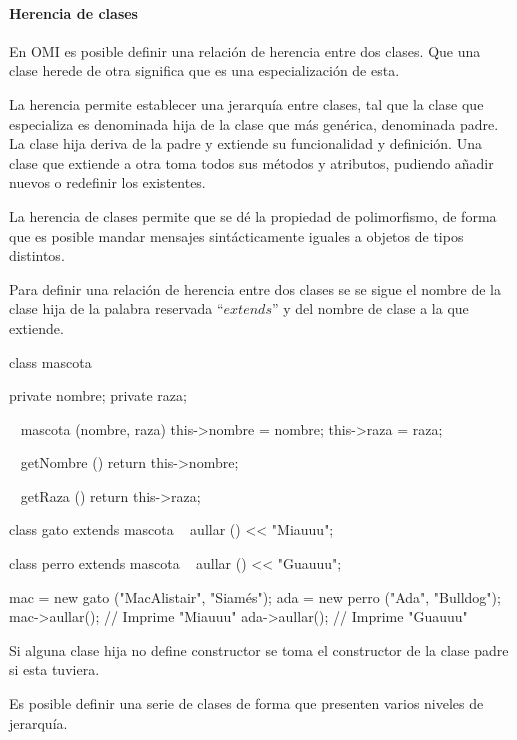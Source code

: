 \paragraph{Herencia de clases}


En OMI es posible definir una relación de herencia entre dos clases. Que una clase herede de otra significa 
que es una especialización de esta.  

La herencia permite establecer una jerarquía entre clases, tal que la clase que especializa es denominada 
hija de la clase que más genérica, denominada padre. La clase hija deriva de la padre y extiende su funcionalidad y definición.
Una clase que extiende a otra toma todos sus métodos y atributos, pudiendo añadir nuevos o redefinir los existentes.

La herencia de clases permite que se dé la propiedad de polimorfismo, de forma que 
es posible mandar mensajes sintácticamente iguales a objetos de tipos distintos.

Para definir una relación de herencia entre dos clases se se sigue el nombre de la clase hija de la palabra 
reservada ``$extends$'' y del nombre de clase a la que extiende. \\



\begin{myverbatim}
   class mascota {
      private nombre; 
      private raza;
      
      ~ mascota (nombre, raza) { 
        this->nombre = nombre; 
        this->raza = raza;
      }
      
      ~ getNombre () {
         return this->nombre;
      }
      
      ~ getRaza () {
         return this->raza;
      }
      
   }

   class gato extends mascota {
       ~ aullar () { 
         << "Miauuu";
      }
   }

   class perro extends mascota {
       ~ aullar () { 
         << "Guauuu";
      }
   }
   
   mac = new gato ("MacAlistair", "Siamés"); 
   ada = new perro ("Ada", "Bulldog");  
   mac->aullar(); // Imprime "Miauuu"
   ada->aullar(); // Imprime "Guauuu"
\end{myverbatim}

Si alguna clase hija no define constructor se toma el constructor de la clase padre si esta tuviera. 

Es posible definir una serie de clases de forma que presenten varios niveles de jerarquía.



